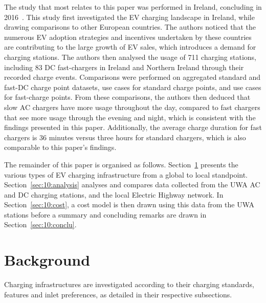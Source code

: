 The study that most relates to this paper was performed in Ireland, concluding in 2016~\cite{morrissey_future_2016}. This study first investigated the EV charging landscape in Ireland, while drawing comparisons to other European countries. The authors noticed that the numerous EV adoption strategies and incentives undertaken by these countries are contributing to the large growth of EV sales, which introduces a demand for charging stations. The authors then analysed the usage of 711 charging stations, including 83 DC fast-chargers in Ireland and Northern Ireland through their recorded charge events. Comparisons were performed on aggregated standard and fast-DC charge point datasets, use cases for standard charge points, and use cases for fast-charge points. From these comparisons, the authors then deduced that slow AC chargers have more usage throughout the day, compared to fast chargers that see more usage through the evening and night, which is consistent with the findings presented in this paper. Additionally, the average charge duration for fast chargers is 36 minutes versus three hours for standard chargers, which is also comparable to this paper's findings.  %

The remainder of this paper is organised as follows. Section~\ref{sec:10:acdc} presents the various types of EV charging infrastructure from a global to local standpoint. 
Section~\ref{sec:10:analysis} analyses and compares data collected from the UWA AC and DC charging stations, and the local Electric Highway network. 
In Section~\ref{sec:10:cost}, a cost model is then drawn using this data from the UWA stations %
before a summary and concluding remarks are drawn in Section~\ref{sec:10:conclu}.

\section{Background}
\label{sec:10:acdc}
Charging infrastructures are investigated according to their charging standards, features and inlet preferences, as detailed in their respective subsections. 

